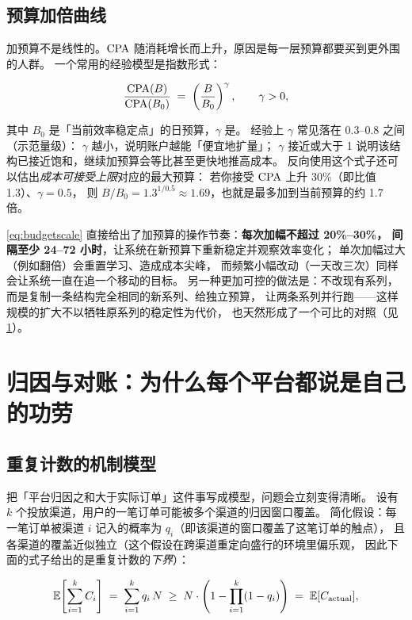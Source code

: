 \subsection{预算加倍曲线}

加预算不是线性的。$\operatorname{CPA}$ 随消耗增长而上升，原因是每一层预算都要买到更外围的人群。
一个常用的经验模型是指数形式：

\begin{equation}
\frac{\operatorname{CPA}(B)}{\operatorname{CPA}(B_0)} \;=\; \left(\frac{B}{B_0}\right)^{\gamma},
\qquad \gamma > 0 ,
\label{eq:budgetscale}
\end{equation}

其中 $B_0$ 是「当前效率稳定点」的日预算，$\gamma$ 是。
经验上 $\gamma$ 常见落在 0.3--0.8 之间（示范量级）：
$\gamma$ 越小，说明账户越能「便宜地扩量」；
$\gamma$ 接近或大于 1 说明该结构已接近饱和，继续加预算会等比甚至更快地推高成本。
反向使用这个式子还可以估出\emph{成本可接受上限}对应的最大预算：
若你接受 $\operatorname{CPA}$ 上升 30\%（即比值 1.3）、$\gamma = 0.5$，
则 $B / B_0 = 1.3^{1/0.5} \approx 1.69$，也就是最多加到当前预算的约 1.7 倍。

\cref{eq:budgetscale} 直接给出了加预算的操作节奏：\textbf{每次加幅不超过 20\%--30\%，
间隔至少 24--72 小时}，让系统在新预算下重新稳定并观察效率变化；
单次加幅过大（例如翻倍）会重置学习、造成成本尖峰，
而频繁小幅改动（一天改三次）同样会让系统一直在追一个移动的目标。
另一种更加可控的做法是：不改现有系列，
而是复制一条结构完全相同的新系列、给独立预算，
让两条系列并行跑——这样规模的扩大不以牺牲原系列的稳定性为代价，
也天然形成了一个可比的对照（见 \cref{sec:meta-attribution}）。

\section{归因与对账：为什么每个平台都说是自己的功劳}
\label{sec:meta-attribution}

\subsection{重复计数的机制模型}

把「平台归因之和大于实际订单」这件事写成模型，问题会立刻变得清晰。
设有 $k$ 个投放渠道，用户的一笔订单可能被多个渠道的归因窗口覆盖。
简化假设：每一笔订单被渠道 $i$ 记入的概率为 $q_i$（即该渠道的窗口覆盖了这笔订单的触点），
且各渠道的覆盖近似独立（这个假设在跨渠道重定向盛行的环境里偏乐观，
因此下面的式子给出的是重复计数的\emph{下界}）：

\begin{equation}
\operatorname{\mathbb{E}}\!\left[\sum_{i=1}^{k} C_i\right] \;=\; \sum_{i=1}^{k} q_i \, N \;\ge\; N \cdot \left(1 - \prod_{i=1}^{k}(1-q_i)\right) \;=\; \operatorname{\mathbb{E}}[C_{\text{actual}}] ,
\label{eq:doublecount}
\end{equation}

